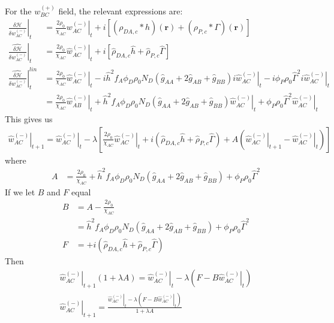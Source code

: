 \documentclass{article}
\begin{document}
For the $w_{BC}^{(+)}$ field, the relevant expressions are:
\begin{align*}
  \left. \frac{\delta \mathcal{H}}{\delta  w_{AC}^{(-)} } \right|_t &=
    \frac{2\rho_0}{\chi_{AC}} \left. w_{AC}^{(-)} \right|_t
    + i [ (\rho_{DA,c} \ast h)(\mathbf{r})
          + (\rho_{P,c} \ast \Gamma)(\mathbf{r}) ] \\
    \left. \hat{\frac{\delta \mathcal{H}}{\delta w_{AC}^{(-)}}} \right|_t &=
    \frac{2\rho_0}{\chi_{AC}} \left. \hat{w}_{AC}^{(-)} \right|_t
    + i [ \hat{\rho}_{DA,c} \hat{h}
          + \hat{\rho}_{P,c}  \hat{\Gamma} ] \\
  \left. \hat{\frac{\delta \mathcal{H}}{\delta w_{AC}^{(-)}}} \right| ^{lin}_t &=
    \frac{2\rho_0}{\chi_{AC}} \left. \hat{w}_{AC}^{(-)} \right|_t
    - i \hat{h}^2 f_A \phi_D \rho_0 N_D
      (\hat{g}_{AA} + 2 \hat{g}_{AB} + \hat{g}_{BB}) i \left.
        \hat{w}_{AC}^{(-)} \right|_t
    - i \phi_P \rho_0 \hat{\Gamma}^2 i \left. \hat{w}_{AC}^{(-)} \right|_t \\
  &= \frac{2\rho_0}{\chi_{AC}} \left. \hat{w}_{AB}^{(-)} \right|_t
    + \hat{h}^2 f_A \phi_D \rho_0 N_D
      (\hat{g}_{AA} + 2 \hat{g}_{AB} + \hat{g}_{BB})
        \left. \hat{w}_{AC}^{(-)} \right|_t
    + \phi_P \rho_0 \hat{\Gamma}^2 \left. \hat{w}_{AC}^{(-)} \right|_t
\end{align*}
This gives us
\begin{align*}
  \left. \hat{w}_{AC}^{(-)} \right|_{t+1} =
    \left. \hat{w}_{AC}^{(-)} \right|_t - \lambda \left[
      \frac{2\rho_0}{\chi_{AC}} \left. \hat{w}_{AC}^{(-)} \right|_t
      + i ( \hat{\rho}_{DA,c} \hat{h}
            + \hat{\rho}_{P,c}  \hat{\Gamma} )
      + A ( \left. \hat{w}_{AC}^{(-)} \right|_{t+1}
            - \left. \hat{w}_{AC}^{(-)} \right|_t)
    \right]
\end{align*}
where
\begin{align*}
  A &=
  \frac{2\rho_0}{\chi_{AC}}
      + \hat{h}^2 f_A \phi_D \rho_0 N_D
        (\hat{g}_{AA} + 2 \hat{g}_{AB} + \hat{g}_{BB})
      + \phi_P \rho_0 \hat{\Gamma}^2
\end{align*}
If we let $B$ and $F$ equal
\begin{align*}
  B &= A - \frac{2\rho_0}{\chi_{AC}} \\
    &= \hat{h}^2 f_A \phi_D \rho_0 N_D
        (\hat{g}_{AA} + 2 \hat{g}_{AB} + \hat{g}_{BB})
      + \phi_P \rho_0 \hat{\Gamma}^2 \\
  F &= + i ( \hat{\rho}_{DA,c} \hat{h}
            + \hat{\rho}_{P,c}  \hat{\Gamma} )
\end{align*}
Then
\begin{align*}
  \left. \hat{w}_{AC}^{(-)} \right|_{t+1} ( 1 + \lambda A ) =
    \left. \hat{w}_{AC}^{(-)} \right|_t
    - \lambda \left( F - B \left. \hat{w}_{AC}^{(-)} \right|_t \right) \\
  \left. \hat{w}_{AC}^{(-)} \right|_{t+1} =
  \frac{\left. \hat{w}_{AC}^{(-)} \right|_t - \lambda
          \left( F - B \left. \hat{w}_{AC}^{(-)} \right|_t \right)}
       {1 + \lambda A}
\end{align*}
\end{document}
